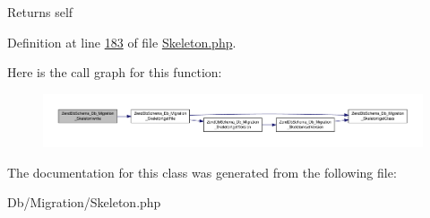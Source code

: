 \begin{DoxyReturn}{Returns}
self 
\end{DoxyReturn}


Definition at line \hyperlink{Skeleton_8php_source_l00183}{183} of file \hyperlink{Skeleton_8php_source}{Skeleton.\-php}.



Here is the call graph for this function\-:\nopagebreak
\begin{figure}[H]
\begin{center}
\leavevmode
\includegraphics[width=350pt]{classZendDbSchema__Db__Migration__Skeleton_a71668c68edcf35f36f111963a9b625df_cgraph}
\end{center}
\end{figure}




The documentation for this class was generated from the following file\-:\begin{DoxyCompactItemize}
\item 
Db/\-Migration/Skeleton.\-php\end{DoxyCompactItemize}
